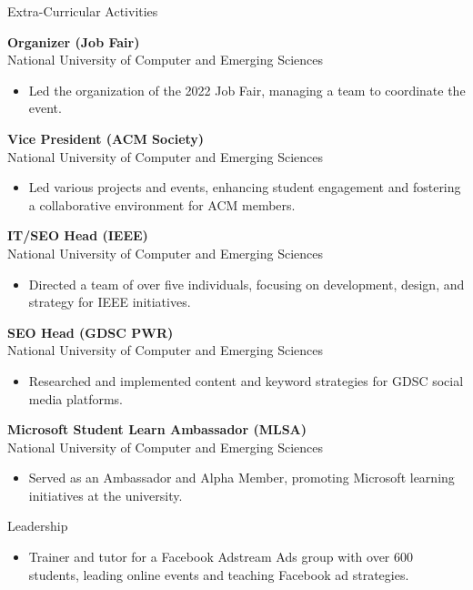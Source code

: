 \documentclass{resume}
\begin{document}

\begin{rSection}{Extra-Curricular Activities} 

\textbf{Organizer (Job Fair)} \\
National University of Computer and Emerging Sciences
\begin{itemize}
    \item Led the organization of the 2022 Job Fair, managing a team to coordinate the event.
\end{itemize}

\textbf{Vice President (ACM Society)} \\
National University of Computer and Emerging Sciences
\begin{itemize}
    \item Led various projects and events, enhancing student engagement and fostering a collaborative environment for ACM members.
\end{itemize}



\textbf{IT/SEO Head (IEEE)} \\
National University of Computer and Emerging Sciences
\begin{itemize}
    \item Directed a team of over five individuals, focusing on development, design, and strategy for IEEE initiatives.
\end{itemize}

\textbf{SEO Head (GDSC PWR)} \\
National University of Computer and Emerging Sciences
\begin{itemize}
    \item Researched and implemented content and keyword strategies for GDSC social media platforms.
\end{itemize}

\textbf{Microsoft Student Learn Ambassador (MLSA)} \\
National University of Computer and Emerging Sciences
\begin{itemize}
    \item Served as an Ambassador and Alpha Member, promoting Microsoft learning initiatives at the university.
\end{itemize}



\end{rSection}


\begin{rSection}{Leadership} 
\begin{itemize}
    \item Trainer and tutor for a Facebook Adstream Ads group with over 600 students, leading online events and teaching Facebook ad strategies.
\end{itemize}
\end{rSection}
\end{document}
